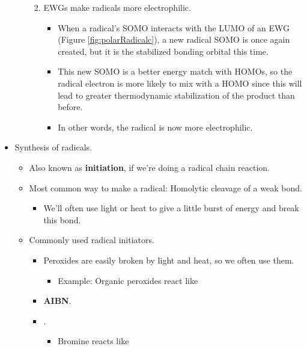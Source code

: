 \documentclass[../notes.tex]{subfiles}
\begin{document}
\begin{itemize}
\begin{itemize}
\begin{enumerate}
\begin{itemize}
            \end{itemize}
            \item EWGs make radicals more electrophilic.
            \begin{itemize}
                \item When a radical's SOMO interacts with the LUMO of an EWG (Figure \ref{fig:polarRadicalc}), a new radical SOMO is once again created, but it is the stabilized bonding orbital this time.
                \item This new SOMO is a better energy match with HOMOs, so the radical electron is more likely to mix with a HOMO since this will lead to greater thermodynamic stabilization of the product than before.
                \item In other words, the radical is now more electrophilic.
            \end{itemize}
        \end{enumerate}
    \end{itemize}
    \item Synthesis of radicals.
    \begin{itemize}
        \item Also known as \textbf{initiation}, if we're doing a radical chain reaction.
        \item Most common way to make a radical: Homolytic cleavage of a weak bond.
        \begin{itemize}
            \item We'll often use light or heat to give a little burst of energy and break this bond.
        \end{itemize}
        \item Commonly used radical initiators.
        \begin{itemize}
            \item Peroxides are easily broken by light and heat, so we often use them.
            \begin{itemize}
                \item Example: Organic peroxides react like 
            \end{itemize}
            \item \textbf{AIBN}.
            \item {}.
            \begin{itemize}
                \item Bromine reacts like 
            \end{itemize}

\end{itemize}
\end{itemize}
\end{itemize}
\end{document}
